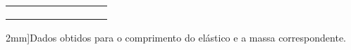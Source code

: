 \begin{table*}
\begin{center}
\begin{tabular}{lp{20mm}p{20mm}p{20mm}lp{20mm}p{20mm}p{20mm}l}
		& \cellcolor[gray]{0.95} & \cellcolor[gray]{0.97} & \cellcolor[gray]{0.95} & & \cellcolor[gray]{0.95} & \cellcolor[gray]{0.97} & \cellcolor[gray]{0.95} & \\
		& \cellcolor[gray]{0.89} & \cellcolor[gray]{0.92} & \cellcolor[gray]{0.89} & & \cellcolor[gray]{0.89} & \cellcolor[gray]{0.92} & \cellcolor[gray]{0.89} & \\
		& \cellcolor[gray]{0.95} & \cellcolor[gray]{0.97} & \cellcolor[gray]{0.95} & & \cellcolor[gray]{0.95} & \cellcolor[gray]{0.97} & \cellcolor[gray]{0.95} & \\
\bottomrule
		\end{tabular}
	\caption[][2mm]{Dados obtidos para o comprimento do elástico e a massa correspondente.}\label{Tab:ResistoresOhmicosENaoOhmicos}
	\end{center}
\end{table*}

